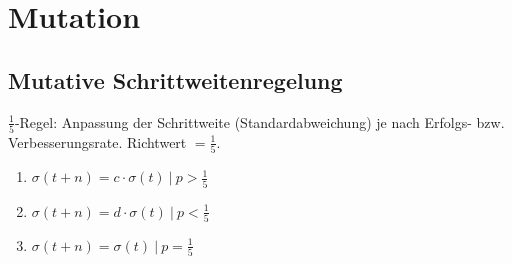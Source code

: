 
\section{Mutation}

\subsection{Mutative Schrittweitenregelung}

$\frac{1}{5}$-Regel: Anpassung der Schrittweite (Standardabweichung) je nach Erfolgs- bzw. Verbesserungsrate. Richtwert $= \frac{1}{5}$.

\begin{enumerate}
	\item $\sigma(t+n) = c \cdot \sigma(t)\ |\ p > \frac{1}{5}$
    \item $\sigma(t+n) = d \cdot \sigma(t)\ |\ p < \frac{1}{5}$
    \item $\sigma(t+n) = \sigma(t)\ |\ p = \frac{1}{5}$
\end{enumerate}
